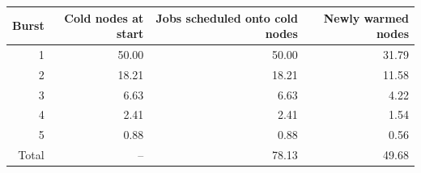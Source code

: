 \begin{tabular}{rrrr}
\toprule
Burst & Cold nodes at start & Jobs scheduled onto cold nodes & Newly warmed nodes \\
\midrule
1 & 50.00 & 50.00 & 31.79 \\
2 & 18.21 & 18.21 & 11.58 \\
3 & 6.63 & 6.63 & 4.22 \\
4 & 2.41 & 2.41 & 1.54 \\
5 & 0.88 & 0.88 & 0.56 \\
\midrule
Total & -- & 78.13 & 49.68 \\
\bottomrule
\end{tabular}

